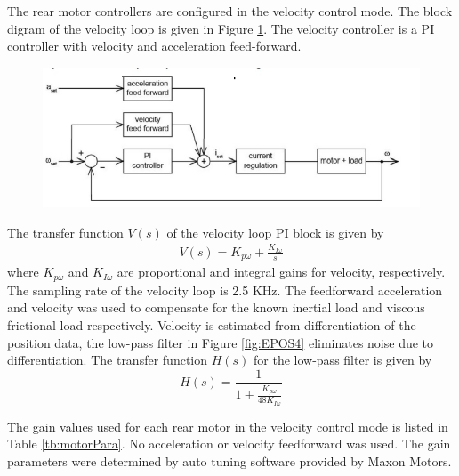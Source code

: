  
  The rear motor controllers are configured in the velocity control mode.  The block digram  of the velocity loop is given in Figure \ref{fig:velloop}. The velocity controller is a PI controller with  velocity and acceleration feed-forward. 
  \begin{figure}
  	\includegraphics[width=\linewidth,keepaspectratio]{Chapter5/fig/velLoop}
  	\label{fig:velloop} 
  \end{figure}
  The transfer function $V(s)$ of the velocity loop PI block is given by
  \begin{eqnarray}
  V(s)=K_{p\omega}+\frac{K_{I\omega}}{s}
  \end{eqnarray}  where $K_{p\omega}$ and  $K_{I\omega}$ are  proportional and integral gains for velocity, respectively.   The sampling rate of the  velocity loop is 2.5 KHz. The feedforward acceleration and  velocity was used to compensate for the known inertial load and  viscous frictional load  \cite{maxonAppNotesPosition} respectively.   Velocity is estimated from differentiation of  the position data, the low-pass filter  in Figure \ref{fig:EPOS4}  eliminates noise due to differentiation. The transfer function $H(s)$ for the  low-pass filter is given by
  \begin{equation}
  H(s)=\frac{1}{1+\frac{K_{p\omega}}{48K_{I\omega}}}
  \end{equation} 
  
  The gain values used for each rear motor in  the velocity control mode is listed in Table \ref{tb:motorPara}. No acceleration or velocity feedforward  was used. The gain parameters were determined by auto tuning software provided by Maxon Motors.  
  

